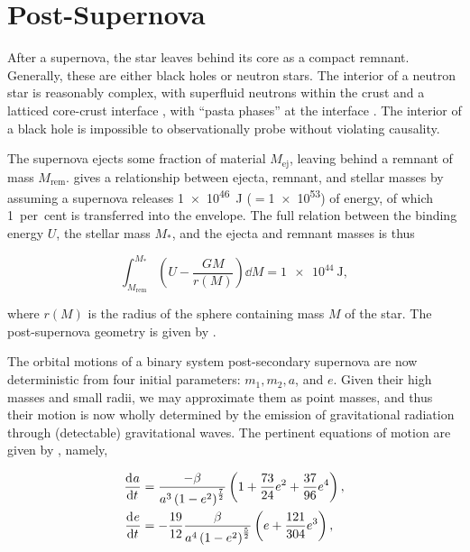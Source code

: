 \section{Post-Supernova}\label{sec:post_SN}


After a supernova, the star leaves behind its core as a compact remnant. Generally, these are either black holes or neutron stars. The interior of a neutron star is reasonably complex, with superfluid neutrons within the crust \citep{Lattimer:2001} and a latticed core-crust interface \citep{Rueda:2014}, with ``pasta phases'' at the interface \citep{Zdunik:2017}. The interior of a black hole is impossible to observationally probe without violating causality.

The supernova ejects some fraction of material $M_\text{ej}$, leaving behind a remnant of mass $M_\text{rem}$. \citet{Eldridge:2004} gives a relationship between ejecta, remnant, and stellar masses by assuming a supernova releases \SI[print-unity-mantissa=false]{1e46}{\joule} ($=$\SI[print-unity-mantissa=false]{1e53}{\erg}) of energy, of which 1~per~cent is transferred into the envelope. The full relation between the binding energy $U$, the stellar mass $M_*$, and the ejecta and remnant masses is thus

\begin{equation}
    \int_{M_\text{rem}}^{M_*} \left(U-\frac{GM}{r(M)}\right)\dd{M} = \SI[print-unity-mantissa=false]{1e44}{\joule},
\end{equation}

where $r(M)$ is the radius of the sphere containing mass $M$ of the star. The post-supernova geometry is given by \citet{Tauris:1998}.

The orbital motions of a binary system post-secondary supernova are now deterministic from four initial parameters: $m_1, m_2, a$, and $e$. Given their high masses and small radii, we may approximate them as point masses, and thus their motion is now wholly determined by the emission of gravitational radiation through (detectable) gravitational waves. The pertinent equations of motion are given by \citet{Peters:1964}, namely,

\begin{align}
    \dv{a}{t} &= \frac{-\beta}{a^3\left(1-e^2\right)^\frac72}\left(1+\frac{73}{24}e^2+\frac{37}{96}e^4\right), \label{eq:dadt}\\
    \dv{e}{t} &= -\frac{19}{12}\frac{\beta}{a^4\left(1-e^2\right)^\frac52}\left(e+\frac{121}{304}e^3\right),\label{eq:dedt}
\end{align}

